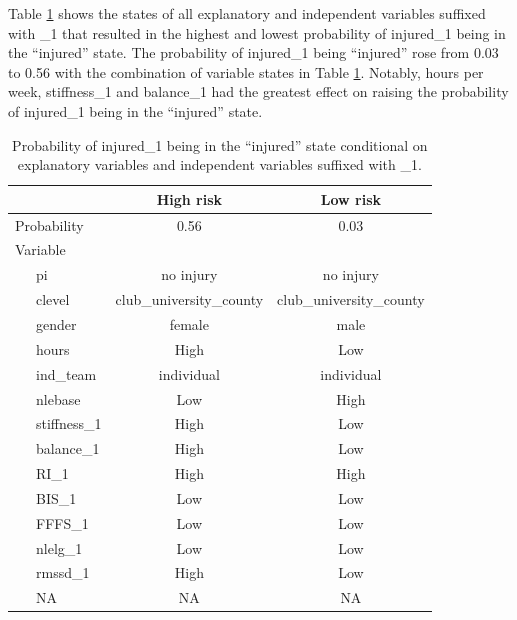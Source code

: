 \documentclass[man,floatsintext]{apa6}
\begin{document}
Table \ref{tab:fullnetworkquery1} shows the states of all explanatory and independent variables suffixed with \_1 that resulted in the highest and lowest probability of injured\_1 being in the \enquote{injured} state.
The probability of injured\_1 being \enquote{injured} rose from 0.03 to 0.56 with the combination of variable states in Table \ref{tab:fullnetworkquery1}. Notably, hours per week, stiffness\_1 and balance\_1 had the greatest effect on raising the probability of injured\_1 being in the \enquote{injured} state.

\begin{table}[H]

\begin{center}
\begin{threeparttable}

\caption{\label{tab:fullnetworkquery1}Probability of injured\_1 being in the ``injured'' state conditional on explanatory variables and independent variables suffixed with \_1.}

\begin{tabular}{lcc}
\toprule
 & High risk & Low risk\\
\midrule
Probability & 0.56 & 0.03\\
Variable &  & \\
\ \ \ pi & no injury & no injury\\
\ \ \ clevel & club\_university\_county & club\_university\_county\\
\ \ \ gender & female & male\\
\ \ \ hours & High & Low\\
\ \ \ ind\_team & individual & individual\\
\ \ \ nlebase & Low & High\\
\ \ \ stiffness\_1 & High & Low\\
\ \ \ balance\_1 & High & Low\\
\ \ \ RI\_1 & High & High\\
\ \ \ BIS\_1 & Low & Low\\
\ \ \ FFFS\_1 & Low & Low\\
\ \ \ nlelg\_1 & Low & Low\\
\ \ \ rmssd\_1 & High & Low\\
\ \ \ NA & NA & NA\\
\bottomrule
\end{tabular}

\end{threeparttable}
\end{center}

\end{table}
\end{document}
